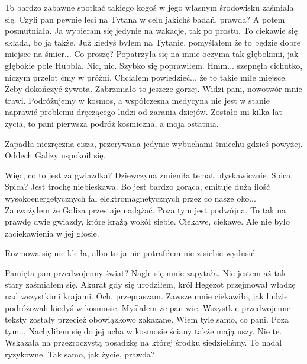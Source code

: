 \begin{dialogue}
	\ds{} To bardzo zabawne spotkać takiego kogoś w jego własnym środowisku \dm{} zaśmiała się. \dm{}
		Czyli pan pewnie leci na Tytana w celu jakichś badań, prawda? \dm{} A potem posmutniała. \dm{} Ja wybieram się jedynie na wakacje, tak po prostu.
	\ds{} To ciekawie się składa, bo ja także. Już kiedyś byłem na Tytanie, pomyślałem że to będzie dobre miejsce na śmier...
	\ds{} Co proszę? \dm{} Popatrzyła się na mnie oczyma tak głębokimi, jak głębokie pole Hubbla.
	\ds{} Nic, nic. \dm{} Szybko się poprawiłem.
	\ds{} Hmm... \dm{} szepnęła cichutko, niczym przelot ćmy w próżni.
	\ds{} Chciałem powiedzieć... że to takie miłe miejsce. Żeby dokończyć żywota. \dm{} Zabrzmiało to jeszcze gorzej. \dm{} Widzi pani, 
		nowotwór mnie trawi. Podróżujemy w kosmos, a współczesna medycyna nie jest w stanie naprawić problemu dręczącego ludzi od zarania dziejów.
		Zostało mi kilka lat życia, to pani pierwsza podróż kosmiczna, a moja ostatnia.
\end{dialogue}

Zapadła niezręczna cisza, przerywana jedynie wybuchami śmiechu gdzieś powyżej.
Oddech Galizy uspokoił się.

\begin{dialogue}
	\ds{} Więc, co to jest za gwiazdka? \dm{} Dziewczyna zmieniła temat błyskawicznie. 
	\ds{} Spica. 
	\ds{} Spica? Jest trochę niebieskawa.
	\ds{} Bo jest bardzo gorąca, emituje dużą ilość wysokoenergetycznych fal elektromagnetycznych przez co nasze oko... \dm{} Zauważyłem że Galiza przestaje nadążać.
		\dm{} Poza tym jest podwójna. To tak na prawdę dwie gwiazdy, które krążą wokół siebie.
	\dm{} Ciekawe, ciekawe. \dm{} Ale nie było zaciekawienia w jej głosie.
\end{dialogue}

Rozmowa się nie kleiła, albo to ja nie potrafiłem nic z siebie wydusić.

\begin{dialogue}
	\ds{} Pamięta pan przedwojenny świat? \dm{} Nagle się mnie zapytała. 
	\ds{} Nie jestem aż tak stary \dm{} zaśmiałem się. \dm{} Akurat gdy się urodziłem, król Hegezot przejmował władzę nad wszystkimi krajami.
	\ds{} Och, przepraszam. Zawsze mnie ciekawiło, jak ludzie podróżowali kiedyś w kosmosie. Myślałem że pan wie. Wszystkie przedwojenne teksty zostały przecież obowiązkowo zakazane.
	\ds{} Wiem tyle samo, co pani. Poza tym... \dm{} Nachyliłem się do jej ucha \dm{} w kosmosie ściany także mają uszy.
	\ds{} Nie te. \dm{} Wskazała na przezroczystą posadzkę na której środku siedzieliśmy.
	\ds{} To nadal ryzykowne.
	\ds{} Tak samo, jak życie, prawda?
\end{dialogue}

